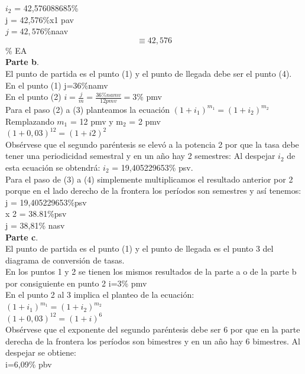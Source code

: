 $i_{2}$ = 42,576088685\%  \\j = 42,576\%x1 pav\\
$j = 42,576$\%naav $$\equiv  42,576$$\% EA\\

\textbf{Parte b}.\\
El punto de partida es el punto (1) y el punto de llegada debe ser el punto (4).\\
En el punto (1)  j=36\%namv\\
En el punto (2)  $i=\frac{j}{m} = \frac{36\% namv}{12 pmv} = 3\%$ pmv\\
Para el paso (2) a (3) planteamos la ecuación $(1+i_{1})^{m_{1}}= (1+i_{2})^{m_{2}}$\\
Remplazando $m_{1}$ = 12 pmv y m$_{2}$ = 2 pmv\\

$(1 + 0,03)^{12} = (1 + i2)^2$\\

Obsérvese que el segundo paréntesis se elevó a la potencia 2 por que la tasa debe tener una periodicidad semestral y en un año hay 2 semestres: Al despejar $i_{2}$ de esta ecuación se obtendrá: $i_{2}$ = 19,405229653\% psv.\\


Para el paso de (3) a (4) simplemente multiplicamos el resultado anterior por 2 porque en el lado derecho de la frontera los períodos son semestres y así tenemos:\\ 

j = 19,405229653\%psv\\ x 2 = 38.81\%psv\\
j = 38,81\% nasv\\

\textbf{Parte c}.\\

El punto de partida es el punto (1) y el punto de llegada es el punto 3 del diagrama de conversión de tasas.\\

En los puntos 1 y 2 se tienen los mismos resultados de la parte a o de la parte b por consiguiente en punto 2 i=3\% pmv\\

En el punto 2 al 3 implica el planteo de la ecuación:\\

$(1+i_{1})^{m_{1}} =(1+i_{2})^{m_{2}}$\\
$(1 + 0,03)^{12} = (1 + i)^6$\\

Obsérvese que el exponente del segundo paréntesis debe ser 6 por que en la parte derecha de la frontera los períodos son bimestres y en un año hay 6 bimestres. Al despejar se obtiene:\\ 
i=6,09\% pbv\\

